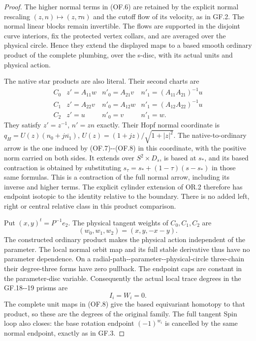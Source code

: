 \begin{proof}
The higher normal terms in (OF.6) are retained by the explicit
normal rescaling \((z,n)\mapsto(z,\tau n)\) and the cutoff
flow of its velocity, as in GF.2. The normal linear blocks remain
invertible. The flows are supported in the disjoint curve
interiors, fix the protected vertex collars, and are averaged
over the physical circle. Hence they extend the displayed maps
to a based smooth ordinary product of the complete plumbing,
over the s-disc, with its actual units and physical action.

The native star products are also literal. Their second charts
are
\[
\begin{array}{c|ccc}
 C_0&z'=A_{11}w&n'_0=A_{21}v&n'_1=(A_{11}A_{21})^{-1}u\\
 C_1&z'=A_{22}v&n'_0=A_{12}w&n'_1=(A_{12}A_{22})^{-1}u\\
 C_2&z'=u&n'_0=v&n'_1=w.
\end{array}                                               \tag{OF.9}
\]
They satisfy \(z'=z^{-1}\), \(n'=zn\) exactly. Their Hopf
normal coordinate is
\(q_H=U(z)(n_0+j\overline{n_1})\),
\(U(z)=(1+jz)/\sqrt{1+|z|^2}\). The native-to-ordinary
arrow is the one induced by (OF.7)-\/-(OF.8) in this coordinate,
with the positive norm carried on both sides. It extends over
\(S^2\times D_s\), is based at \(s_*\), and its based
contraction is obtained by substituting
\(s_\tau=s_*+(1-\tau)(s-s_*)\) in those same formulas.
This is a contraction of the full normal arrow, including its
inverse and higher terms. The explicit cylinder extension of
OR.2 therefore has endpoint isotopic to the identity relative
to the boundary. There is no added left, right or central
relative class in this product comparison.

Put \((x,y)^t=P^{-1}e_2\). The physical tangent weights of
\(C_0,C_1,C_2\) are
\[
 (w_0,w_1,w_2)=(x,y,-x-y).                            \tag{OF.10}
\]
The constructed ordinary product makes the physical action
independent of the parameter. The local normal orbit map and
its full stable derivative thus have no parameter dependence.
On a radial-path-\/-parameter-\/-physical-circle three-chain their
degree-three forms have zero pullback. The endpoint caps are
constant in the parameter-disc variable. Consequently the
actual local trace degrees in the GF.18-\/-19 prisms are
\[
                       I_i=W_i=0.                    \tag{OF.11}
\]
The complete unit maps in (OF.8) give the based equivariant
homotopy to that product, so these are the degrees of the
original family. The full tangent Spin loop also closes:
the base rotation endpoint \((-1)^{w_i}\) is cancelled by
the same normal endpoint, exactly as in GF.3.


\end{proof}
